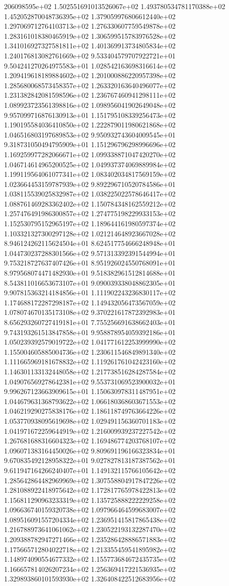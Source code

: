 206098595e+02	1.502551691013526067e+02	1.493780534781170388e+02	1.452052870048736395e+02	1.379059976806612440e+02	1.297069712764103713e+02	1.276330607759549878e+02	1.283161018380465919e+02	1.306599515783976528e+02	1.341016927327581811e+02	1.401369913734805834e+02	1.240176813082761669e+02	9.533404579707922721e+01	9.504241270264975583e+01	1.028542163698316614e+02	1.209419618189884602e+02	1.201000886220957398e+02	1.285680068573458357e+02	1.263320163640496077e+02	1.231382842081598596e+02	1.236767460941298111e+02	1.089923723561398816e+02	1.098956041902649048e+02	9.957099716876130913e+01	1.151795108339256473e+02	1.190195584036410850e+02	1.222879011980621868e+02	1.046516803197689853e+02	9.950932743604009545e+01	9.318731050494795909e+01	1.151296796298996696e+02	1.169259977282066671e+02	1.099338871047420270e+02	1.046714614965200525e+02	1.049937374069889984e+02	1.199119564061077341e+02	1.083402034817569159e+02	1.023664453159787939e+02	9.892296710520784586e+01	1.038115539025832987e+02	1.038225022578646417e+02	1.088761469283362402e+02	1.150784348162559212e+02	1.257476491986300857e+02	1.274775198229933153e+02	1.152530795152965197e+02	1.189644161980597374e+02	1.103321327300297128e+02	1.021214648923667028e+02	8.946124262115624504e+01	8.624517754666248948e+01	1.044730237288301566e+02	9.571313392391544994e+01	9.753218727637407426e+01	8.951926024550768091e+01	8.979568074471482930e+01	9.518382961512814688e+01	8.543811016653673107e+01	9.090039338048862305e+01	9.907815363214184856e+01	1.111902243236830117e+02	1.174688172287298187e+02	1.149432056473567059e+02	1.078074670135173108e+02	9.370221617872392983e+01	8.656293260727419181e+01	7.755256691638662403e+01	9.743193261513847858e+01	9.958878954059392186e+01	1.050239392579019722e+02	1.041771612253999990e+02	1.155004605885004736e+02	1.230611546849891340e+02	1.111665969181678832e+02	1.119261761042423160e+02	1.146301133132448058e+02	1.217738516284287584e+02	1.049076569278642381e+02	9.553731069523900032e+01	9.996267123663909615e+01	1.150630978311487951e+02	1.044679631368793622e+02	1.066180368603671553e+02	1.046219290275838176e+02	1.186118749763664226e+02	1.053770938095619698e+02	1.029491156360701183e+02	1.041971672259644919e+02	1.216009939237227542e+02	1.267681688316604323e+02	1.169486774203768107e+02	1.096071383164450026e+02	9.809691196166323834e+01	9.670835492128958322e+01	9.027827813187387562e+01	9.611947164266240407e+01	1.149132115766105642e+02	1.285642864482969969e+02	1.307558804917847226e+02	1.281088922418975642e+02	1.172817765978422813e+02	1.156811290963233319e+02	1.135725888222229258e+02	1.096636740159320738e+02	1.097966464599683007e+02	1.089516091557204334e+02	1.236951415817865438e+02	1.216788973641061062e+02	1.230522193132287470e+02	1.209388782947271466e+02	1.235286428886571883e+02	1.175665712804022718e+02	1.213355459541895982e+02	1.148974090554677332e+02	1.155773684672435735e+02	1.166657814026207234e+02	1.256369417221536935e+02	1.329893860101593930e+02	1.326408422512683956e+02
